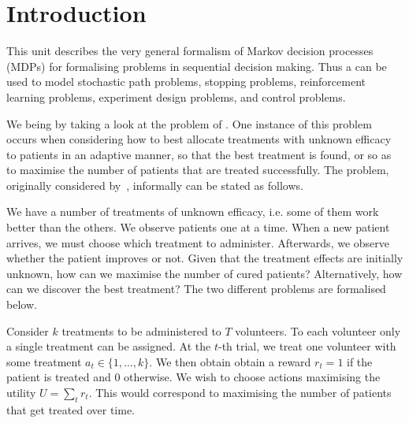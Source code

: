 
\section{Introduction}
\label{sec:mdp-introduction}
This unit describes the very general formalism of Markov decision
processes (MDPs) for formalising problems in sequential decision
making.  Thus a  can be used to model
stochastic path problems, stopping problems, reinforcement learning
problems, experiment design problems, and control problems.

We being by taking a look at the problem of . One instance of this problem occurs when considering how to
best allocate treatments with unknown efficacy to patients in an
adaptive manner, so that the best treatment is found, or so as to
maximise the number of patients that are treated successfully. The
problem, originally considered
by~\cite{Chernoff:SequentialDesignExperiments,chernoff1966smc},
informally can be stated as follows.

We have a number of treatments of unknown efficacy, i.e. some of them
work better than the others. We observe patients one at a time. When a
new patient arrives, we must choose which treatment to
administer. Afterwards, we observe whether the patient improves or
not. Given that the treatment effects are initially unknown, how can
we maximise the number of cured patients? Alternatively, how can we
discover the best treatment? The two different problems are formalised
below.

\begin{example}
  Consider $k$ treatments to be administered to $T$ volunteers.  To each
  volunteer only a single treatment can be assigned.  At the $t$-th trial, we treat one volunteer with some treatment $a_t \in \{1, \ldots, k\}$. We then obtain  obtain a reward $r_t = 1$ if the patient is treated and $0$ otherwise.  We wish to choose actions maximising the utility  $U = \sum_t r_t$. This would correspond to maximising the number of patients that get treated over time.
\end{example}

